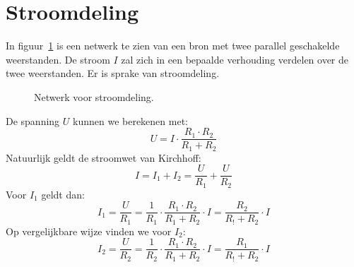 \section{Stroomdeling}
In figuur~\ref{fig:gelstroomdeling} is een netwerk te zien van een bron met twee parallel
geschakelde weerstanden. De stroom $I$ zal zich in een bepaalde verhouding
verdelen over de twee weerstanden. Er is sprake van stroomdeling.

\begin{figure}[!ht]
\centering
{}
\caption{Netwerk voor stroomdeling.}
\label{fig:gelstroomdeling}
\end{figure}

De spanning $U$ kunnen we berekenen met:
%
\begin{equation}
U = I\cdot\dfrac{R_1\cdot R_2}{R_1+R_2}
\end{equation}
%
Natuurlijk geldt de stroomwet van Kirchhoff:
%
\begin{equation}
I = I_1 + I_2 = \dfrac{U}{R_1} + \dfrac{U}{R_2}
\end{equation}
%
Voor $I_1$ geldt dan:
%
\begin{equation}
I_1 = \dfrac{U}{R_1} = \dfrac{1}{R_1}\cdot\dfrac{R_1\cdot R_2}{R_1+R_2}\cdot I = \dfrac{R_2}{R_!+R_2}\cdot I
\end{equation}
%
Op vergelijkbare wijze vinden we voor $I_2$:
%
\begin{equation}
I_2 = \dfrac{U}{R_2} = \dfrac{1}{R_2}\cdot\dfrac{R_1\cdot R_2}{R_1+R_2}\cdot I = \dfrac{R_1}{R_!+R_2}\cdot I
\end{equation}

